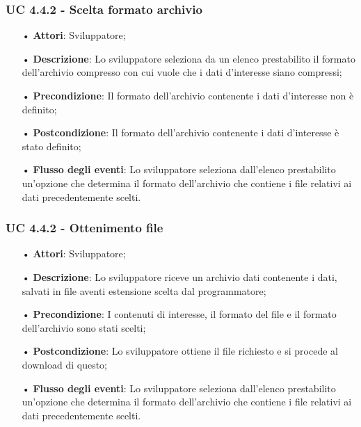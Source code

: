 \subsubsection{UC 4.4.2 - Scelta formato archivio}
\begin{itemize}
\item[•]\textbf{Attori}: Sviluppatore;
\item[•]\textbf{Descrizione}: Lo sviluppatore seleziona da un elenco prestabilito il formato dell'archivio compresso con cui vuole che i dati d'interesse siano compressi;
\item[•]\textbf{Precondizione}: Il formato dell'archivio contenente i dati d'interesse non è definito;
\item[•]\textbf{Postcondizione}: Il formato dell'archivio contenente i dati d'interesse è stato definito;
\item[•]\textbf{Flusso degli eventi}:  Lo sviluppatore seleziona dall'elenco prestabilito un'opzione che determina il formato dell'archivio che contiene i file relativi ai dati precedentemente scelti.
\end{itemize}

\subsubsection{UC 4.4.2 - Ottenimento file}
\begin{itemize}
\item[•]\textbf{Attori}: Sviluppatore;
\item[•]\textbf{Descrizione}: Lo sviluppatore riceve un archivio dati contenente i dati, salvati in file aventi estensione scelta dal programmatore;
\item[•]\textbf{Precondizione}: I contenuti di interesse, il formato del file e il formato dell'archivio sono stati scelti;
\item[•]\textbf{Postcondizione}: Lo sviluppatore ottiene il file richiesto e si procede al download di questo;
\item[•]\textbf{Flusso degli eventi}:  Lo sviluppatore seleziona dall'elenco prestabilito un'opzione che determina il formato dell'archivio che contiene i file relativi ai dati precedentemente scelti.
\end{itemize}

